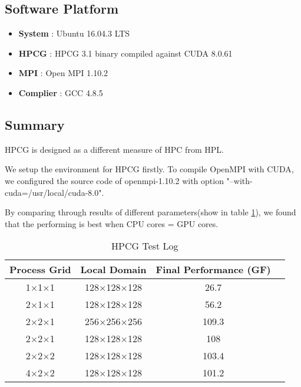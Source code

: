 \documentclass{mcmthesis}
\begin{document}
\subsection{Software Platform}

\begin{itemize}
	\item \textbf{System} : Ubuntu 16.04.3 LTS
	\item \textbf{HPCG} : HPCG 3.1 binary compiled against CUDA 8.0.61
	\item \textbf{MPI} : Open MPI 1.10.2
	\item \textbf{Complier} : GCC 4.8.5
\end{itemize}

\subsection{Summary}

\par HPCG is designed as a different measure of HPC from HPL. 


\par We setup the environment for HPCG firstly. To compile OpenMPI with CUDA, we configured the source code of openmpi-1.10.2 with option "--with-cuda=/usr/local/cuda-8.0".

\par By comparing through results of different parameters(show in table \ref{tab:HPCG Test Log}), we found that the performing is best when CPU cores = GPU cores.


\begin{table}[h]
\centering
\caption{HPCG Test Log}\label{tab:HPCG Test Log}
\begin{tabular}{cccc}
\toprule
Process Grid	& Local Domain	& Final Performance (GF) \\
\midrule
1$\times$1$\times$1	&128$\times$128$\times$128	&26.7\\
2$\times$1$\times$1	&128$\times$128$\times$128	&56.2\\
2$\times$2$\times$1	&256$\times$256$\times$256	&109.3\\
2$\times$2$\times$1	&128$\times$128$\times$128	&108\\
2$\times$2$\times$2	&128$\times$128$\times$128	&103.4\\
4$\times$2$\times$2	&128$\times$128$\times$128	&101.2\\
\bottomrule
\end{tabular}
\end{table}
\end{document}
